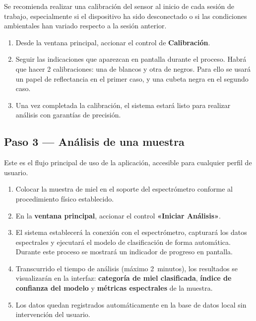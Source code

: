 Se recomienda realizar una calibración del sensor al inicio de cada sesión
de trabajo, especialmente si el dispositivo ha sido desconectado o si las
condiciones ambientales han variado respecto a la sesión anterior.

\begin{enumerate}
    \item Desde la ventana principal, accionar el control de
    \textbf{Calibración}.
    \item Seguir las indicaciones que aparezcan en pantalla durante el proceso. Habrá que hacer 2 calibraciones: una de blancos y otra de negros. Para ello se usará un papel de reflectancia en el primer caso, y una cubeta negra en el segundo caso.
    \item Una vez completada la calibración, el sistema estará listo para
    realizar análisis con garantías de precisión.
\end{enumerate}

\subsection*{Paso 3 — Análisis de una muestra}

Este es el flujo principal de uso de la aplicación, accesible para cualquier
perfil de usuario.

\begin{enumerate}
    \item Colocar la muestra de miel en el soporte del espectrómetro conforme
    al procedimiento físico establecido.
    \item En la \textbf{ventana principal}, accionar el control
    \textbf{«Iniciar Análisis»}.
    \item El sistema establecerá la conexión con el espectrómetro, capturará
    los datos espectrales y ejecutará el modelo de clasificación de forma
    automática. Durante este proceso se mostrará un indicador de progreso en
    pantalla.
    \item Transcurrido el tiempo de análisis (máximo 2~minutos), los resultados
    se visualizarán en la interfaz: \textbf{categoría de miel clasificada},
    \textbf{índice de confianza del modelo} y \textbf{métricas espectrales}
    de la muestra.
    \item Los datos quedan registrados automáticamente en la base de datos
    local sin intervención del usuario.
\end{enumerate}


